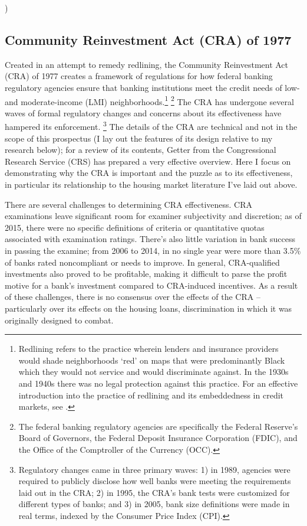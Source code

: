 )\documentclass{article}[11pt]
\begin{document}
	\subsection{Community Reinvestment Act (CRA) of 1977}
Created in an attempt to remedy redlining, the Community Reinvestment Act (CRA) of 1977 creates a framework of regulations for how federal banking regulatory agencies ensure that banking institutions meet the credit needs of low- and moderate-income (LMI) neighborhoods.\footnote{Redlining refers to the practice wherein lenders and insurance providers would shade neighborhoods `red' on maps that were predominantly Black which they would not service and would discriminate against. In the 1930s and 1940s there was no legal protection against this practice. For an effective introduction into the practice of redlining and its embeddedness in credit markets, see \cite{hillier2003redlining}.} \footnote{The federal banking regulatory agencies are specifically the Federal Reserve's Board of Governors, the Federal Deposit Insurance Corporation (FDIC), and the Office of the Comptroller of the Currency (OCC).} The CRA has undergone several waves of formal regulatory changes and concerns about its effectiveness have hampered its enforcement. \footnote{Regulatory changes came in three  primary waves: 1) in 1989, agencies were required to publicly disclose how well banks were meeting the requirements laid out in the CRA; 2) in 1995, the CRA's bank tests were customized for different types of banks; and 3) in 2005, bank size definitions were made in real terms, indexed by the Consumer Price Index (CPI).} The details of the CRA are technical and not in the scope of this prospectus (I lay out the features of its design relative to my research below); for a review of its contents, Getter from the Congressional Research Service (CRS) has prepared a very effective overview. \citep{getter2015effectiveness} Here I focus on demonstrating why the CRA is important and the puzzle as to its effectiveness, in particular its relationship to the housing market literature I've laid out above.

There are several challenges to determining CRA effectiveness. \citep{getter2015effectiveness} CRA examinations leave significant room for examiner subjectivity and discretion; as of 2015, there were no specific definitions of criteria or quantitative quotas associated with examination ratings. There's also little variation in bank success in passing the examine; from 2006 to 2014, in no single year were more than 3.5\% of banks rated noncompliant or needs to improve. In general, CRA-qualified investments also proved to be  profitable, making it difficult to parse the profit motive for a bank's investment compared to CRA-induced incentives. As a result of these challenges, there is no consensus over the effects of the CRA -- particularly over its effects on the housing loans, discrimination in which it was originally designed to combat.
\end{document}
